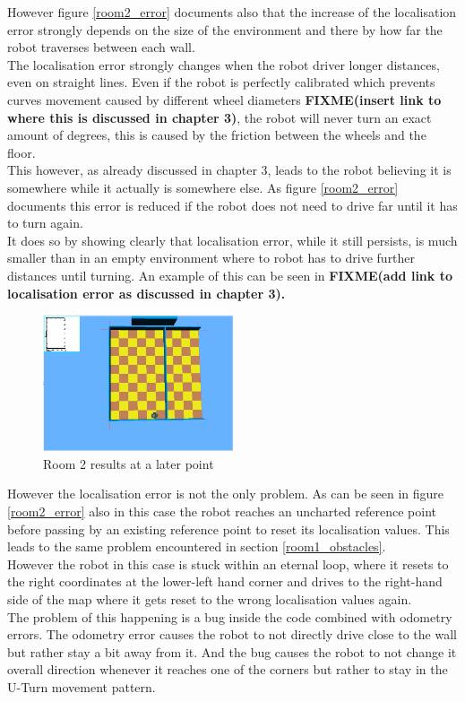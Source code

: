 However figure \ref{room2_error} documents also that the increase of the localisation error strongly depends on the size of the environment and there by how far the robot traverses between each wall. \\
The localisation error strongly changes when the robot driver longer distances, even on straight lines. Even if the robot is perfectly calibrated which prevents curves movement caused by different wheel diameters \textbf{FIXME(insert link to where this is discussed in chapter 3)}, the robot will never turn an exact amount of degrees, this is caused by the friction between the wheels and the floor. \\
This however, as already discussed in chapter 3, leads to the robot believing it is somewhere while it actually is somewhere else.  As figure \ref{room2_error} documents this error is reduced if the robot does not need to drive far until it has to turn again.\\
It does so by showing clearly that localisation error, while it still persists, is much smaller than in an empty environment where to robot has to drive further distances until turning. An example of this can be seen in\textbf{ FIXME(add link to localisation error as discussed in chapter 3).} \\[3ex] 

\begin{figure}[h]
\centering
\includegraphics[width = 0.5\textwidth]{../../figures/map_results/save_corner_with_odometry_error_later.png} 
\caption{Room 2 results at a later point}
\label{room2_results_later}
\end{figure}

However the localisation error is not the only problem. As can be seen in figure \ref{room2_error} also in this case the robot reaches an uncharted reference point before passing by an existing reference point to reset its localisation values. This leads to the same problem encountered in section \ref{room1_obstacles}. \\
However the robot in this case is stuck within an eternal loop, where it resets to the right coordinates at the lower-left hand corner and drives to the right-hand side of the map where it gets reset to the wrong localisation values again. \\
The problem of this happening is a bug inside the code combined with odometry errors. The odometry error causes the robot to not directly drive close to the wall but rather stay a bit away from it. And the bug causes the robot to not change it overall direction whenever it reaches one of the corners but rather to stay in the U-Turn movement pattern.

